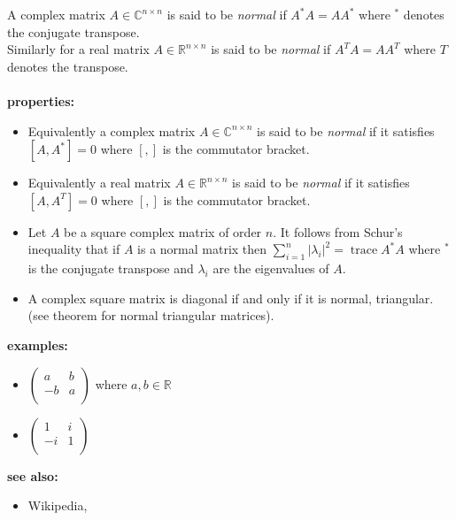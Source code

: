 \documentclass[12pt]{article}
\begin{document}

A complex matrix $A \in \mathbb{C}^{n\times n}$ is said to be \emph{normal} if $A^\ast A = AA^\ast$ where $^\ast$ denotes the conjugate transpose.\\
Similarly for a real matrix $A \in \mathbb{R}^{n\times n}$ is said to be \emph{normal} if $A^TA=AA^T$ where $T$ denotes the transpose.\\\\
\textbf{properties:}
\begin{itemize}
\item Equivalently a complex matrix $A \in \mathbb{C}^{n\times n}$ is said to be \emph{normal} if it satisfies $[A,A^\ast]=0$ where $[,]$ is the commutator bracket.

\item Equivalently a real matrix $A \in \mathbb{R}^{n\times n}$ is said to be \emph{normal} if it satisfies $[A,A^T]=0$ where $[,]$ is the commutator bracket.

\item Let $A$ be a square complex matrix of order $n$. It follows from Schur's inequality that if $A$ is a normal matrix then $\sum_{i=1}^n |\lambda_i|^2 = \operatorname{trace} A^\ast A$ where $^\ast$ is the conjugate transpose and $\lambda_i$ are the eigenvalues of $A$.

\item   A complex square matrix is diagonal if and only if it is normal,  triangular.(see theorem for normal triangular matrices).
\end{itemize}

\textbf{examples:}
\begin{itemize}
\item $\begin{pmatrix}
a & b \\
-b & a \\\end{pmatrix}$ where $a,b \in \mathbb{R}$
\item $\begin{pmatrix}
1 & i \\
-i & 1 \\\end{pmatrix}$
\end{itemize}

\textbf{see also:}
\begin{itemize}
\item Wikipedia, 
\end{itemize}
\end{document}
